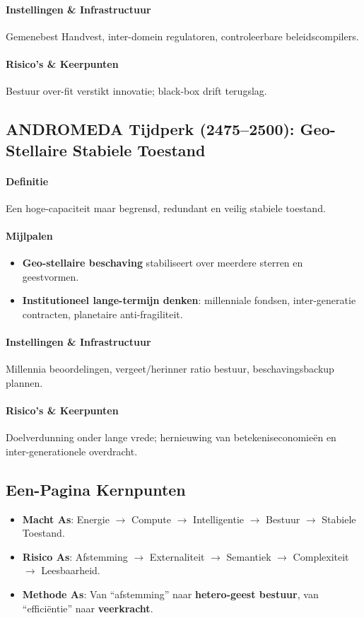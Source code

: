 \documentclass[11pt]{article}
\begin{document}
\paragraph{Instellingen \& Infrastructuur} Gemenebest Handvest, inter-domein regulatoren, controleerbare beleidscompilers.

\paragraph{Risico's \& Keerpunten} Bestuur over-fit verstikt innovatie; black-box drift terugslag.

\subsection{ANDROMEDA Tijdperk (2475–2500): Geo-Stellaire Stabiele Toestand}
\paragraph{Definitie} Een hoge-capaciteit maar begrensd, redundant en veilig stabiele toestand.

\paragraph{Mijlpalen}
\begin{itemize}[noitemsep]
  \item \textbf{Geo-stellaire beschaving} stabiliseert over meerdere sterren en geestvormen.
  \item \textbf{Institutioneel lange-termijn denken}: millenniale fondsen, inter-generatie contracten, planetaire anti-fragiliteit.
\end{itemize}

\paragraph{Instellingen \& Infrastructuur} Millennia beoordelingen, vergeet/herinner ratio bestuur, beschavingsbackup plannen.

\paragraph{Risico's \& Keerpunten} Doelverdunning onder lange vrede; hernieuwing van betekeniseconomieën en inter-generationele overdracht.

\subsection{Een-Pagina Kernpunten}
\begin{itemize}[noitemsep]
  \item \textbf{Macht As}: Energie $\rightarrow$ Compute $\rightarrow$ Intelligentie $\rightarrow$ Bestuur $\rightarrow$ Stabiele Toestand.
  \item \textbf{Risico As}: Afstemming $\rightarrow$ Externaliteit $\rightarrow$ Semantiek $\rightarrow$ Complexiteit $\rightarrow$ Leesbaarheid.
  \item \textbf{Methode As}: Van ``afstemming'' naar \textbf{hetero-geest bestuur}, van ``efficiëntie'' naar \textbf{veerkracht}.
\end{itemize}
\end{document}
